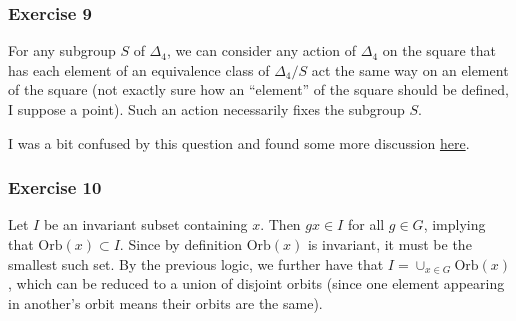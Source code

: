 \subsubsection{Exercise 9}
For any subgroup $S$ of $\Delta_4$, we can consider any action of $\Delta_4$ on the square that has each
element of an equivalence class of $\Delta_4 / S$ act the same way on an element of the square (not exactly
sure how an ``element'' of the square should be defined, I suppose a point). Such an action necessarily
fixes the subgroup $S$.

I was a bit confused by this question and found some more discussion \href{https://math.stackexchange.com/questions/76255/show-every-subgroup-of-d4-can-be-regarded-as-an-isotropy-group-for-a-suitable-ac}{here}.

\subsubsection{Exercise 10}
Let $I$ be an invariant subset containing $x$. Then $gx \in I$ for all $g \in G$, implying that 
$\text{Orb}(x) \subset I$. Since by definition  $\text{Orb}(x)$ is invariant, it must be the smallest such
set. By the previous logic, we further have that $I = \cup_{x \in G} \text{Orb}(x)$, which can be reduced
to a union of disjoint orbits (since one element appearing in another's orbit means their orbits are the same).
